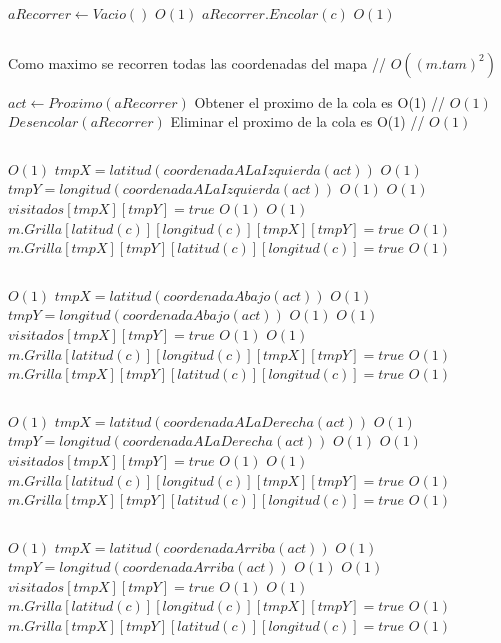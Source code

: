 \begin{Algoritmos}
\begin{algorithmic}[1]
\State $aRecorrer \gets Vacio() $ \Comment $O(1)$
\State $aRecorrer.Encolar(c)$ \Comment $O(1)$

\State $ $

    \Comment Como maximo se recorren todas las coordenadas del mapa // $O((m.tam)^2)$

\State $act \gets Proximo(aRecorrer)$ \Comment Obtener el proximo de la cola es O(1) // $O(1)$
\State $Desencolar(aRecorrer)$ \Comment Eliminar el proximo de la cola es O(1) // $O(1)$

\State $ $


      \Comment $O(1)$
\State $tmpX = latitud(coordenadaALaIzquierda(act))$   \Comment $O(1)$
\State $tmpY = longitud(coordenadaALaIzquierda(act))$  \Comment $O(1)$
    \Comment $O(1)$
\State $visitados[tmpX][tmpY] = true$    \Comment $O(1)$
	 	\Comment $O(1)$
		\State $m.Grilla[latitud(c)][longitud(c)][tmpX][tmpY] = true$ \Comment $O(1)$
		\State $m.Grilla[tmpX][tmpY][latitud(c)][longitud(c)] = true$ \Comment $O(1)$
	\EndIf
\EndIf
\EndIf

\State $ $

      \Comment $O(1)$
\State $tmpX = latitud(coordenadaAbajo(act))$   \Comment $O(1)$
\State $tmpY = longitud(coordenadaAbajo(act))$  \Comment $O(1)$
    \Comment $O(1)$
\State $visitados[tmpX][tmpY] = true$    \Comment $O(1)$
	 	\Comment $O(1)$
		\State $m.Grilla[latitud(c)][longitud(c)][tmpX][tmpY] = true$ \Comment $O(1)$
		\State $m.Grilla[tmpX][tmpY][latitud(c)][longitud(c)] = true$ \Comment $O(1)$
	\EndIf
\EndIf
\EndIf

\State $ $


      \Comment $O(1)$
\State $tmpX = latitud(coordenadaALaDerecha(act))$   \Comment $O(1)$
\State $tmpY = longitud(coordenadaALaDerecha(act))$  \Comment $O(1)$
    \Comment $O(1)$
\State $visitados[tmpX][tmpY] = true$    \Comment $O(1)$
	 	\Comment $O(1)$
		\State $m.Grilla[latitud(c)][longitud(c)][tmpX][tmpY] = true$ \Comment $O(1)$
		\State $m.Grilla[tmpX][tmpY][latitud(c)][longitud(c)] = true$ \Comment $O(1)$
	\EndIf
\EndIf
\EndIf

\State $ $

      \Comment $O(1)$
\State $tmpX = latitud(coordenadaArriba(act))$   \Comment $O(1)$
\State $tmpY = longitud(coordenadaArriba(act))$  \Comment $O(1)$
    \Comment $O(1)$
\State $visitados[tmpX][tmpY] = true$    \Comment $O(1)$
	 	\Comment $O(1)$
		\State $m.Grilla[latitud(c)][longitud(c)][tmpX][tmpY] = true$ \Comment $O(1)$
		\State $m.Grilla[tmpX][tmpY][latitud(c)][longitud(c)] = true$ \Comment $O(1)$
	\EndIf
\EndIf
\EndIf



\end{algorithmic}
\end{Algoritmos}
